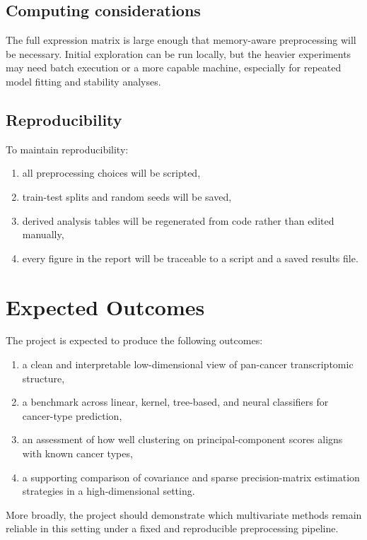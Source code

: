 \documentclass[12pt]{article}
\newcommand{\1}{\mathbf{1}}
\begin{document}
\subsection{Computing considerations}

The full expression matrix is large enough that memory-aware preprocessing will be necessary. Initial exploration can be run locally, but the heavier experiments may need batch execution or a more capable machine, especially for repeated model fitting and stability analyses.

\subsection{Reproducibility}

To maintain reproducibility:
\begin{enumerate}
    \item all preprocessing choices will be scripted,
    \item train-test splits and random seeds will be saved,
    \item derived analysis tables will be regenerated from code rather than edited manually,
    \item every figure in the report will be traceable to a script and a saved results file.
\end{enumerate}

\section{Expected Outcomes}

The project is expected to produce the following outcomes:
\begin{enumerate}
    \item a clean and interpretable low-dimensional view of pan-cancer transcriptomic structure,
    \item a benchmark across linear, kernel, tree-based, and neural classifiers for cancer-type prediction,
    \item an assessment of how well clustering on principal-component scores aligns with known cancer types,
    \item a supporting comparison of covariance and sparse precision-matrix estimation strategies in a high-dimensional setting.
\end{enumerate}

More broadly, the project should demonstrate which multivariate methods remain reliable in this setting under a fixed and reproducible preprocessing pipeline.
\end{document}
